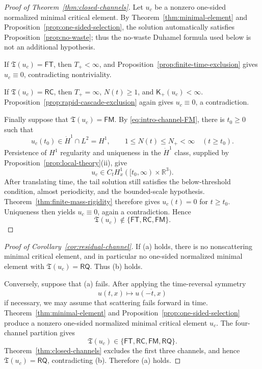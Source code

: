\documentclass{interact}
\numberwithin{equation}{section}
\theoremstyle{plain}
\theoremstyle{definition}
\theoremstyle{remark}
\newcommand{\R}{\mathbb R}
\begin{document}
\begin{proof}[Proof of Theorem~\ref{thm:closed-channels}]
Let $u_c$ be a nonzero one-sided normalized minimal critical element. By Theorem~\ref{thm:minimal-element} and Proposition~\ref{prop:one-sided-selection}, the solution automatically satisfies Proposition~\ref{prop:no-waste}; thus the no-waste Duhamel formula used below is not an additional hypothesis.

If $\mathfrak T(u_c)=\mathsf{FT}$, then $T_+<\infty$, and Proposition~\ref{prop:finite-time-exclusion} gives $u_c\equiv0$, contradicting nontriviality.

If $\mathfrak T(u_c)=\mathsf{RC}$, then $T_+=\infty$, $N(t)\ge1$, and $\mathsf K_+(u_c)<\infty$. Proposition~\ref{prop:rapid-cascade-exclusion} again gives $u_c\equiv0$, a contradiction.

Finally suppose that $\mathfrak T(u_c)=\mathsf{FM}$. By \eqref{eq:intro-channel-FM}, there is $t_0\ge0$ such that
\[
 u_c(t_0)\in\dot H^1\cap L^2=H^1,
 \qquad
 1\le N(t)\le N_+<\infty
 \quad(t\ge t_0).
\]
Persistence of $H^1$ regularity and uniqueness in the $\dot H^1$ class, supplied by Proposition~\ref{prop:local-theory}(ii), give
\[
 u_c\in C_tH_x^1([t_0,\infty)\times\R^3).
\]
After translating time, the tail solution still satisfies the below-threshold condition, almost periodicity, and the bounded-scale hypothesis. Theorem~\ref{thm:finite-mass-rigidity} therefore gives $u_c(t)=0$ for $t\ge t_0$. Uniqueness then yields $u_c\equiv0$, again a contradiction. Hence
\[
 \mathfrak T(u_c)\notin\{\mathsf{FT},\mathsf{RC},\mathsf{FM}\}.
\]
\end{proof}

\begin{proof}[Proof of Corollary~\ref{cor:residual-channel}]
If (a) holds, there is no nonscattering minimal critical element, and in particular no one-sided normalized minimal element with $\mathfrak T(u_c)=\mathsf{RQ}$. Thus (b) holds.

Conversely, suppose that (a) fails. After applying the time-reversal symmetry
\[
 u(t,x)\longmapsto\overline{u(-t,x)}
\]
if necessary, we may assume that scattering fails forward in time. Theorem~\ref{thm:minimal-element} and Proposition~\ref{prop:one-sided-selection} produce a nonzero one-sided normalized minimal critical element $u_c$. The four-channel partition gives
\[
 \mathfrak T(u_c)\in\{\mathsf{FT},\mathsf{RC},\mathsf{FM},\mathsf{RQ}\}.
\]
Theorem~\ref{thm:closed-channels} excludes the first three channels, and hence $\mathfrak T(u_c)=\mathsf{RQ}$, contradicting (b). Therefore (a) holds.
\end{proof}
\end{document}
